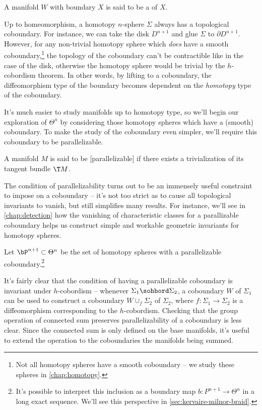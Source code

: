 \begin{definition}
	A manifold $W$ with boundary $X$ is said to be a  of $X$.
\end{definition}

Up to homeomorphism, a homotopy $n$-sphere $\Sigma$ always has a topological coboundary. For instance, we can take the disk $D^{n+1}$ and glue $\Sigma$ to $\partial D^{n+1}$. 
However, for any non-trivial homotopy sphere which \emph{does} have a smooth coboundary,\footnote{Not all homotopy spheres have a smooth coboundary -- we study these spheres in \cref{chap:homotopy}.} the topology of the coboundary can't be contractible like in the case of the disk, otherwise the homotopy sphere would be trivial by the $h$-cobordism theorem. In other words, by lifting to a coboundary, the diffeomorphism type of the boundary becomes dependent on the \emph{homotopy} type of the coboundary. 

It's much easier to study manifolds up to homotopy type, so we'll begin our exploration of $\Theta^n$ by considering those homotopy spheres which have a (smooth) coboundary. To make the study of the coboundary even simpler, we'll require this coboundary to be parallelizable.
\begin{definition}
	A manifold $M$ is said to be [parallelizable] if there exists a trivialization of its tangent bundle $\T M$.
\end{definition}
The condition of parallelizability turns out to be an immensely useful constraint to impose on a coboundary -- it's not too strict as to cause all topological invariants to vanish, but still simplifies many results. For instance, we'll see in \cref{chap:detection} how the vanishing of characteristic classes for a parallizable coboundary helps us construct simple and workable geometric invariants for homotopy spheres.

\begin{definition}
	Let $\bP^{n+1}\subset \Theta^n$ be the set of homotopy spheres with a parallelizable coboundary.\footnote{It's possible to interpret this inclusion as a boundary map $b : P^{n+1} \to \Theta^n$ in a long exact sequence. We'll see this perspective in \cref{sec:kervaire-milnor-braid}.}
\end{definition}

It's fairly clear that the condition of having a parallelizable coboundary is invariant under $h$-cobordism -- whenever $\Sigma_1\sohbord \Sigma_2$, a coboundary $W$ of $\Sigma_1$ can be used to construct a coboundary $W\cup_f \Sigma_2$ of $\Sigma_2$, where $f : \Sigma_1 \to \Sigma_2$ is a diffeomorphism corresponding to the $h$-cobordism. Checking that the group operation of connected sum preserves parallelizability of a coboundary is less clear. Since the connected sum is only defined on the base manifolds, it's useful to extend the operation to the coboundaries the manifolds being summed.

